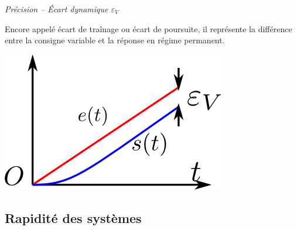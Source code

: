 \documentclass[11pt,oneside]{article}
\begin{document}
\begin{minipage}[c]{0.7\textwidth}
\begin{defi}
 \textit{\textsf{Précision -- Écart dynamique  $\varepsilon_V$}}

Encore appelé écart de traînage ou
écart de poursuite, il représente la différence entre la consigne variable et
la réponse en régime permanent. 
\end{defi}
\end{minipage}\hfill
\begin{minipage}[c]{0.2\textwidth}
 \begin{center}
 \includegraphics[width=\textwidth]{png/precision_dyn}
 \end{center}
\end{minipage}


\subsection{Rapidité des systèmes}
\end{document}
